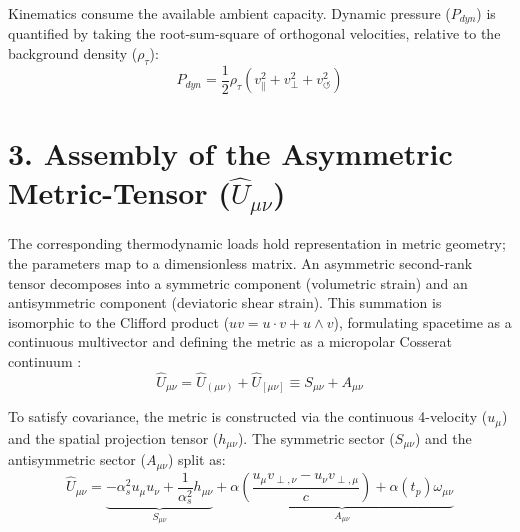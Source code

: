 Kinematics consume the available ambient capacity. Dynamic pressure ($P_{dyn}$) is quantified by taking the root-sum-square of orthogonal velocities, relative to the background density ($\rho_\tau$): 
\begin{equation}
    P_{dyn} = \frac{1}{2} \rho_\tau \left( v_\parallel^2 + v_\perp^2 + v_\circlearrowleft^2 \right) \label{eq:tensor_pdyn}
\end{equation}

\section*{3. Assembly of the Asymmetric Metric-Tensor ($\hat{U}_{\mu\nu}$)}
The corresponding thermodynamic loads hold representation in metric geometry; the parameters map to a dimensionless matrix. An asymmetric second-rank tensor decomposes into a symmetric component (volumetric strain) and an antisymmetric component (deviatoric shear strain). This summation is isomorphic to the Clifford product ($uv = u \cdot v + u \wedge v$), formulating spacetime as a continuous multivector and defining the metric as a micropolar Cosserat continuum \cite{Cosserat1909, Gurtin1981, Eringen1999}: 
\begin{equation}
    \hat{U}_{\mu\nu} = \hat{U}_{(\mu\nu)} + \hat{U}_{[\mu\nu]} \equiv S_{\mu\nu} + A_{\mu\nu} \label{eq:tensor_decomposition}
\end{equation}

To satisfy covariance, the metric is constructed via the continuous 4-velocity ($u_\mu$) and the spatial projection tensor ($h_{\mu\nu}$). The symmetric sector ($S_{\mu\nu}$) and the antisymmetric sector ($A_{\mu\nu}$) split as:
\begin{equation}
    \hat{U}_{\mu\nu} = \underbrace{-\alpha_s^2 u_\mu u_\nu + \frac{1}{\alpha_s^2} h_{\mu\nu}}_{S_{\mu\nu}} + \underbrace{\alpha \left( \frac{u_\mu v_{\perp, \nu} - u_\nu v_{\perp, \mu}}{c} \right) + \alpha(t_p) \omega_{\mu\nu}}_{A_{\mu\nu}} \label{eq:covariant_tensor}
\end{equation}

